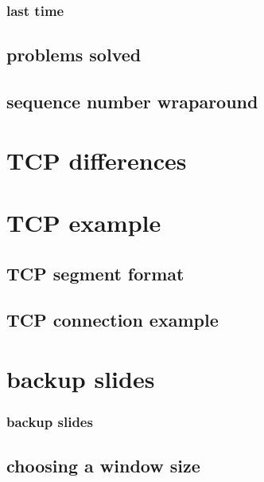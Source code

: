 \date{}
\title{}
\date{}
\usepackage{pgfplots}
\pgfplotsset{compat=1.16}

\begin{frame}
    \titlepage
\end{frame}

\begin{frame}
\frametitle{last time}
\end{frame}


\subsection{problems solved}


\subsection{sequence number wraparound}


\section{TCP differences}



\section{TCP example}

\subsection{TCP segment format}




%

\subsection{TCP connection example}






\section{backup slides}
\begin{frame}\frametitle{backup slides}
\end{frame}
\subsection{choosing a window size}







